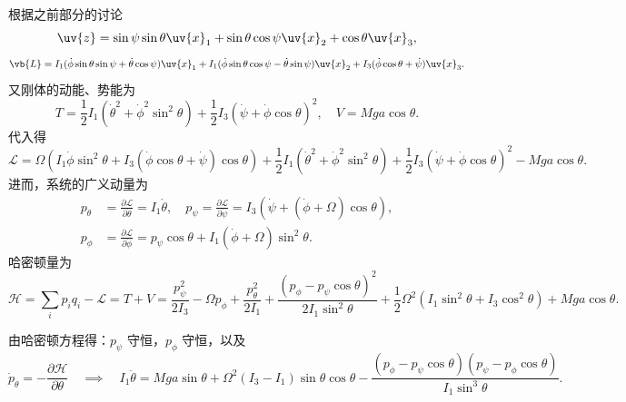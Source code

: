 根据之前部分的讨论
\begin{equation*}
	\uv{z} = \sin \psi \sin \theta \uv{x}_1 + \sin \theta \cos \psi \uv{x}_2 + \cos \theta \uv{x}_3,
\end{equation*}
\begin{equation*}
	\vb{L} = I_1 (\dot{\phi} \sin \theta \sin \psi + \dot{\theta} \cos \psi) \uv{x}_1 + I_1 (\dot{\phi} \sin \theta \cos \psi - \dot{\theta} \sin \psi) \uv{x}_2  + I_3 (\dot{\phi} \cos \theta + \dot{\psi}) \uv{x}_3.
\end{equation*}
又刚体的动能、势能为
\begin{equation*}
	T = \frac{1}{2} I_1 (\dot{\theta}^2 + \dot{\phi}^2 \sin^2 \theta) + \frac{1}{2} I_3 (\dot{\psi} + \dot{\phi} \cos \theta)^2,\quad V = M g a \cos \theta.
\end{equation*}
代入得
\begin{equation*}
	\mathcal{L} = \Omega \left( I_1 \dot{\phi} \sin^2 \theta + I_3 (\dot{\phi} \cos \theta + \dot{\psi}) \cos \theta \right) + \frac{1}{2} I_1 (\dot{\theta}^2 + \dot{\phi}^2 \sin^2 \theta)  + \frac{1}{2} I_3 (\dot{\psi} + \dot{\phi} \cos \theta)^2 - M g a \cos \theta.
\end{equation*}
进而，系统的广义动量为
\begin{align*}
	p_\theta & = \frac{\partial \mathcal{L}}{\partial \dot{\theta}} = I_1 \dot{\theta}, \quad p_\psi = \frac{\partial \mathcal{L}}{\partial \dot{\psi}} = I_3 (\dot{\psi} + (\dot{\phi} + \Omega) \cos \theta), \\
	p_\phi   & = \frac{\partial \mathcal{L}}{\partial \dot{\phi}} = p_\psi \cos \theta + I_1 (\dot{\phi} + \Omega) \sin^2 \theta.
\end{align*}
哈密顿量为
\begin{equation*}
	\mathcal{H} =\displaystyle\sum_i p_i q_i-\mathcal{L}= T + V = \frac{p_\psi^2}{2 I_3} - \Omega p_\phi + \frac{p_\theta^2}{2 I_1} + \frac{(p_\phi - p_\psi \cos \theta)^2}{2 I_1 \sin^2 \theta} + \frac{1}{2} \Omega^2 (I_1 \sin^2 \theta + I_3 \cos^2 \theta) + M g a \cos \theta.
\end{equation*}

由哈密顿方程得：\(p_\psi\) 守恒，\(p_\phi\) 守恒，以及
\begin{equation*}
	\dot{p}_\theta = -\frac{\partial \mathcal{H}}{\partial \theta}\quad\implies\quad
	I_1 \ddot{\theta} = M g a \sin \theta + \Omega^2 (I_3 - I_1) \sin \theta \cos \theta - \frac{(p_\phi - p_\psi \cos \theta)(p_\psi - p_\phi \cos \theta)}{I_1 \sin^3 \theta}.
\end{equation*}

